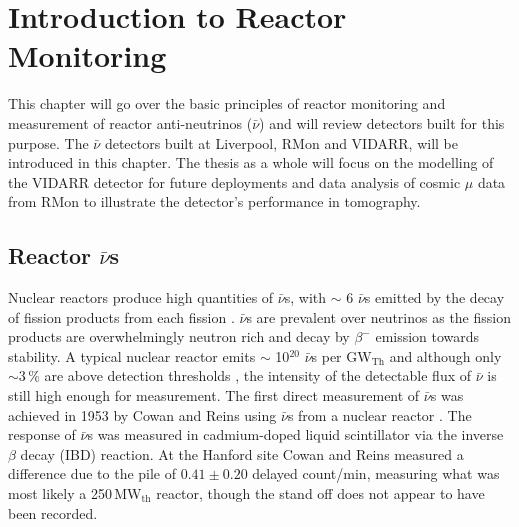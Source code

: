 
\ifpdf
    \graphicspath{{Chapter1/Figs/Raster/}{Chapter1/Figs/PDF/}{Chapter1/Figs/}}
\else
    \graphicspath{{Chapter1/Figs/Vector/}{Chapter1/Figs/}}
\fi

\chapter{Introduction to Reactor Monitoring} \label{Chap:theAimOfVidarr} %
This chapter will go over the basic principles of reactor monitoring and measurement of reactor anti-neutrinos ($\bar{\nu}$) and will review detectors built for this purpose. The $\bar{\nu}$ detectors built at Liverpool, RMon and VIDARR, will be introduced in this chapter. The thesis as a whole will focus on the modelling of the VIDARR detector for future deployments and data analysis of cosmic $\mu$ data from RMon to illustrate the detector's performance in tomography.

\section{Reactor $\bar{\nu}$s} \label{sec:reactorAntiNeutrinos}
Nuclear reactors produce high quantities of $\bar{\nu}$s, with $\sim$ 6 $\bar{\nu}$s emitted by the decay of fission products from each fission \cite{Mueller_2011}. $\bar{\nu}$s are prevalent over neutrinos as the fission products are overwhelmingly neutron rich and decay by $\beta^-$ emission towards stability. A typical nuclear reactor emits $\sim$ 10$^{20}$ $\bar{\nu}$s per GW$_{\textrm{Th}}$ \cite{Mueller_2011} and although only $\sim$3\,\% are above detection thresholds \cite{Mueller_2011}, the intensity of the detectable flux of $\bar{\nu}$ is still high enough for measurement. The first direct measurement of $\bar{\nu}$s was achieved in 1953 by Cowan and Reins using $\bar{\nu}$s from a nuclear reactor \cite{reines1953detection}. The response of $\bar{\nu}$s was measured in cadmium-doped liquid scintillator \cite{reines1953proposed} \cite{Cowan1956Confirmation} via the inverse $\beta$ decay (IBD) reaction. At the Hanford site Cowan and Reins measured a difference due to the pile of $0.41 \pm 0.20$ delayed count/min\cite{reines1953detection}, measuring what was most likely a 250\,MW$_{\textrm{th}}$ reactor, though the stand off does not appear to have been recorded.

